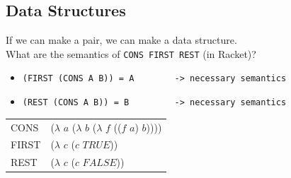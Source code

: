 \documentclass{article}
\begin{document}
\begin{flushleft}
 \subsection{Data Structures}
 If we can make a pair, we can make a data structure.\\
 What are the semantics of \verb|CONS FIRST REST| (in Racket)?\\
 \begin{itemize}
  \item[] \verb|(FIRST (CONS A B)) = A        -> necessary semantics|
  \item[] \verb|(REST (CONS A B)) = B         -> necessary semantics|
 \end{itemize}
 \bigskip
\begin{tabular}{l l}
 CONS & ($\lambda$ $\mathit{a}$ ($\lambda$ $\mathit{b}$ ($\lambda$ $\mathit{f}$ (($\mathit{f}$ $\mathit{a}$) $\mathit{b}$))))\\
 FIRST & ($\lambda$ $\mathit{c}$ ($\mathit{c}$ $\mathit{TRUE}$))\\
 REST & ($\lambda$ $\mathit{c}$ ($\mathit{c}$ $\mathit{FALSE}$))\\
\end{tabular}
\end{flushleft}
\bigskip
\end{document}

